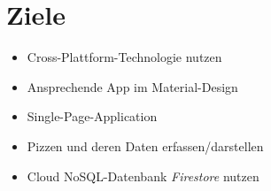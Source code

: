 \section{Ziele}

\begin{itemize}
    \itemsep-0.4em
    \item Cross-Plattform-Technologie nutzen
    \item Ansprechende App im Material-Design
    \item Single-Page-Application
    \item Pizzen und deren Daten erfassen/darstellen
    \item Cloud NoSQL-Datenbank \textit{Firestore} nutzen
\end{itemize}

\newpage
